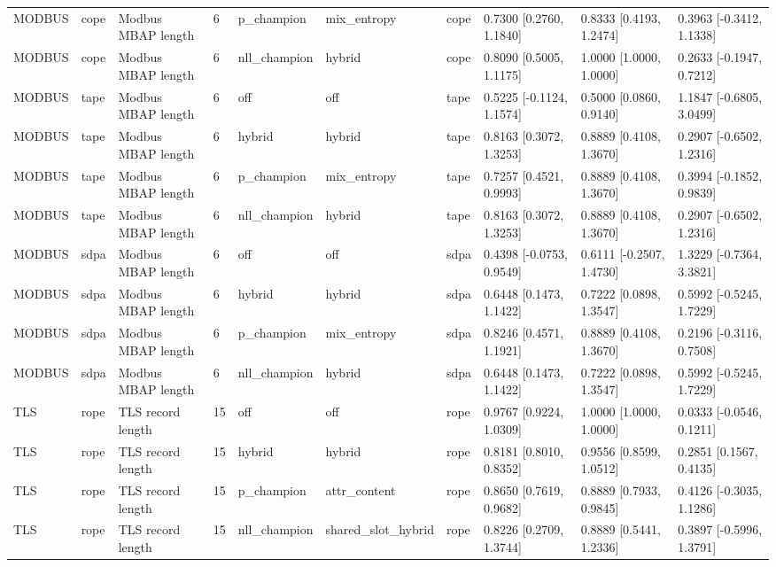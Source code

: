 \begin{tabular}{llllllllll}
MODBUS & cope & Modbus MBAP length & 6 & p\_champion & mix\_entropy & cope & 0.7300 [0.2760, 1.1840] & 0.8333 [0.4193, 1.2474] & 0.3963 [-0.3412, 1.1338] \\
MODBUS & cope & Modbus MBAP length & 6 & nll\_champion & hybrid & cope & 0.8090 [0.5005, 1.1175] & 1.0000 [1.0000, 1.0000] & 0.2633 [-0.1947, 0.7212] \\
MODBUS & tape & Modbus MBAP length & 6 & off & off & tape & 0.5225 [-0.1124, 1.1574] & 0.5000 [0.0860, 0.9140] & 1.1847 [-0.6805, 3.0499] \\
MODBUS & tape & Modbus MBAP length & 6 & hybrid & hybrid & tape & 0.8163 [0.3072, 1.3253] & 0.8889 [0.4108, 1.3670] & 0.2907 [-0.6502, 1.2316] \\
MODBUS & tape & Modbus MBAP length & 6 & p\_champion & mix\_entropy & tape & 0.7257 [0.4521, 0.9993] & 0.8889 [0.4108, 1.3670] & 0.3994 [-0.1852, 0.9839] \\
MODBUS & tape & Modbus MBAP length & 6 & nll\_champion & hybrid & tape & 0.8163 [0.3072, 1.3253] & 0.8889 [0.4108, 1.3670] & 0.2907 [-0.6502, 1.2316] \\
MODBUS & sdpa & Modbus MBAP length & 6 & off & off & sdpa & 0.4398 [-0.0753, 0.9549] & 0.6111 [-0.2507, 1.4730] & 1.3229 [-0.7364, 3.3821] \\
MODBUS & sdpa & Modbus MBAP length & 6 & hybrid & hybrid & sdpa & 0.6448 [0.1473, 1.1422] & 0.7222 [0.0898, 1.3547] & 0.5992 [-0.5245, 1.7229] \\
MODBUS & sdpa & Modbus MBAP length & 6 & p\_champion & mix\_entropy & sdpa & 0.8246 [0.4571, 1.1921] & 0.8889 [0.4108, 1.3670] & 0.2196 [-0.3116, 0.7508] \\
MODBUS & sdpa & Modbus MBAP length & 6 & nll\_champion & hybrid & sdpa & 0.6448 [0.1473, 1.1422] & 0.7222 [0.0898, 1.3547] & 0.5992 [-0.5245, 1.7229] \\
TLS & rope & TLS record length & 15 & off & off & rope & 0.9767 [0.9224, 1.0309] & 1.0000 [1.0000, 1.0000] & 0.0333 [-0.0546, 0.1211] \\
TLS & rope & TLS record length & 15 & hybrid & hybrid & rope & 0.8181 [0.8010, 0.8352] & 0.9556 [0.8599, 1.0512] & 0.2851 [0.1567, 0.4135] \\
TLS & rope & TLS record length & 15 & p\_champion & attr\_content & rope & 0.8650 [0.7619, 0.9682] & 0.8889 [0.7933, 0.9845] & 0.4126 [-0.3035, 1.1286] \\
TLS & rope & TLS record length & 15 & nll\_champion & shared\_slot\_hybrid & rope & 0.8226 [0.2709, 1.3744] & 0.8889 [0.5441, 1.2336] & 0.3897 [-0.5996, 1.3791] \\

\end{tabular}
